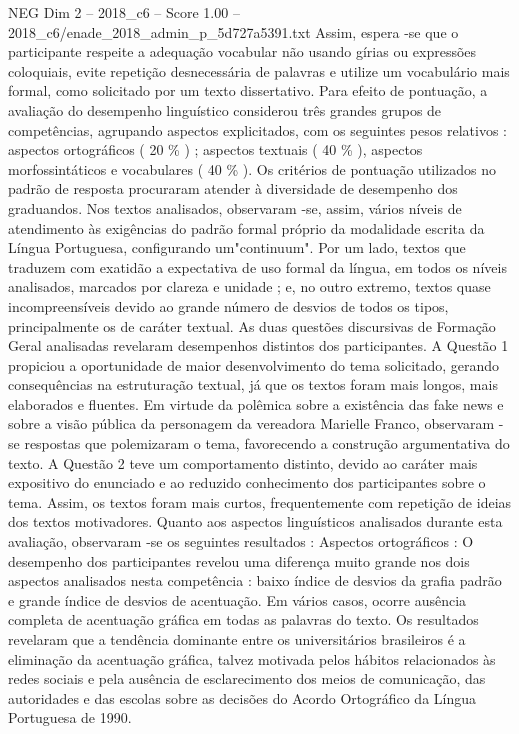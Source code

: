 \begin{textsample}{NEG Dim 2 – 2018\_c6 – Score 1.00 – 2018\_c6/enade\_2018\_admin\_p\_5d727a5391.txt}
Assim, espera -se que o participante respeite a adequação vocabular não usando gírias ou expressões coloquiais, evite repetição desnecessária de palavras e utilize um vocabulário mais formal, como solicitado por um texto dissertativo.
Para efeito de pontuação, a avaliação do desempenho linguístico considerou três grandes grupos de competências, agrupando aspectos explicitados, com os seguintes pesos relativos : aspectos ortográficos ( 20 \% ) ; aspectos textuais ( 40 \% ), aspectos morfossintáticos e vocabulares ( 40 \% ).
Os critérios de pontuação utilizados no padrão de resposta procuraram atender à diversidade de desempenho dos graduandos.
Nos textos analisados, observaram -se, assim, vários níveis de atendimento às exigências do padrão formal próprio da modalidade escrita da Língua Portuguesa, configurando um"continuum".
Por um lado, textos que traduzem com exatidão a expectativa de uso formal da língua, em todos os níveis analisados, marcados por clareza e unidade ; e, no outro extremo, textos quase incompreensíveis devido ao grande número de desvios de todos os tipos, principalmente os de caráter textual.
As duas questões discursivas de Formação Geral analisadas revelaram desempenhos distintos dos participantes.
A Questão 1 propiciou a oportunidade de maior desenvolvimento do tema solicitado, gerando consequências na estruturação textual, já que os textos foram mais longos, mais elaborados e fluentes.
Em virtude da polêmica sobre a existência das fake news e sobre a visão pública da personagem da vereadora Marielle Franco, observaram -se respostas que polemizaram o tema, favorecendo a construção argumentativa do texto.
A Questão 2 teve um comportamento distinto, devido ao caráter mais expositivo do enunciado e ao reduzido conhecimento dos participantes sobre o tema.
Assim, os textos foram mais curtos, frequentemente com repetição de ideias dos textos motivadores.
Quanto aos aspectos linguísticos analisados durante esta avaliação, observaram -se os seguintes resultados : Aspectos ortográficos : O desempenho dos participantes revelou uma diferença muito grande nos dois aspectos analisados nesta competência : baixo índice de desvios da grafia padrão e grande índice de desvios de acentuação.
Em vários casos, ocorre ausência completa de acentuação gráfica em todas as palavras do texto.
Os resultados revelaram que a tendência dominante entre os universitários brasileiros é a eliminação da acentuação gráfica, talvez motivada pelos hábitos relacionados às redes sociais e pela ausência de esclarecimento dos meios de comunicação, das autoridades e das escolas sobre as decisões do Acordo Ortográfico da Língua Portuguesa de 1990.

\end{textsample}
